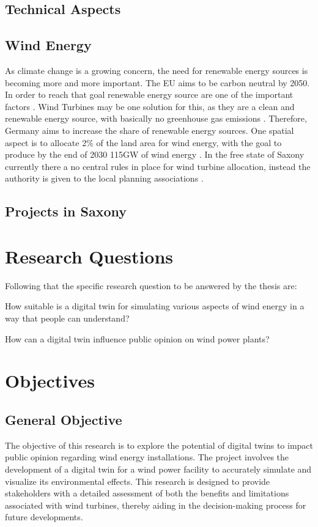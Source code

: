 \documentclass[11pt, titlepage, a4paper]{article}
\begin{document}
\begin{linenumbers}
    \subsection{Technical Aspects}
    \subsection{Wind Energy}
    As climate change is a growing concern, the need for renewable energy sources is becoming more and more important. The EU aims to be carbon neutral by 2050. In order to reach that goal renewable energy source are one of the important factors \cite{europeancommission.directorategeneralforclimateaction.GoingClimateneutral20502019}. Wind Turbines may be one solution for this, as they are a clean and renewable energy source, with basically no greenhouse gas emissions \cite{pryorClimateChangeImpacts2020}.
    Therefore, Germany aims to increase the share of renewable energy sources. One spatial aspect is to allocate 2\% of the land area for wind energy, with the goal to produce by the end of 2030 115GW of wind energy \cite{WindenergieLand}.
    In the free state of Saxony currently there a no central rules in place for wind turbine allocation, instead the authority is given to the local planning associations \cite{fachagenturwindenergieFachagenturWindenergieLand}.
    \subsection{Projects in Saxony}
    \section{Research Questions}
    Following that the specific research question to be answered by the thesis are:
    \begin{questions}
        \item \label{rq:first_q} How suitable is a digital twin for simulating various aspects of wind energy in a way that people can understand?
        \item \label{rq:second_q} How can a digital twin influence public opinion on wind power plants?
    \end{questions}

    \section{Objectives}
    \subsection{General Objective}
    The objective of this research is to explore the potential of digital twins to impact public opinion regarding wind energy installations. The project involves the development of a digital twin for a wind power facility to accurately simulate and visualize its environmental effects. This research is designed to provide stakeholders with a detailed assessment of both the benefits and limitations associated with wind turbines, thereby aiding in the decision-making process for future developments.


\end{linenumbers}
\end{document}
